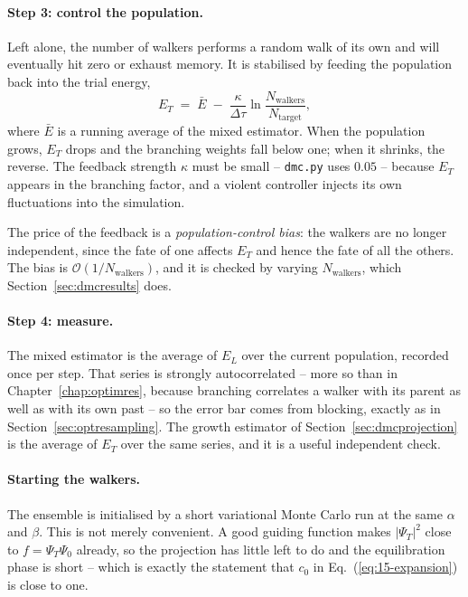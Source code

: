 \paragraph{Step 3: control the population.}
Left alone, the number of walkers performs a random walk of its own and will
eventually hit zero or exhaust memory.  It is stabilised by feeding the
population back into the trial energy,
\begin{equation}
  E_T \;=\; \bar{E} \;-\; \frac{\kappa}{\Delta\tau}
    \ln\frac{N_{\mathrm{walkers}}}{N_{\mathrm{target}}},
  \label{eq:15-populationcontrol}
\end{equation}
where $\bar{E}$ is a running average of the mixed estimator.  When the
population grows, $E_T$ drops and the branching weights fall below one; when
it shrinks, the reverse.  The feedback strength $\kappa$ must be small --
\texttt{dmc.py} uses $0.05$ -- because $E_T$ appears in the branching factor,
and a violent controller injects its own fluctuations into the simulation.

The price of the feedback is a \emph{population-control bias}: the walkers are
no longer independent, since the fate of one affects $E_T$ and hence the fate
of all the others.  The bias is $\mathcal{O}(1/N_{\mathrm{walkers}})$, and it
is checked by varying $N_{\mathrm{walkers}}$, which
Section~\ref{sec:dmcresults} does.

\paragraph{Step 4: measure.}
The mixed estimator is the average of $E_L$ over the current population,
recorded once per step.  That series is strongly autocorrelated -- more so
than in Chapter~\ref{chap:optimres}, because branching correlates a walker
with its parent as well as with its own past -- so the error bar comes from
blocking, exactly as in Section~\ref{sec:optresampling}.  The growth estimator
of Section~\ref{sec:dmcprojection} is the average of $E_T$ over the same
series, and it is a useful independent check.

\paragraph{Starting the walkers.}
The ensemble is initialised by a short variational Monte Carlo run at the same
$\alpha$ and $\beta$.  This is not merely convenient.  A good guiding function
makes $|\Psi_T|^2$ close to $f=\Psi_T\Psi_0$ already, so the projection has
little left to do and the equilibration phase is short -- which is exactly the
statement that $c_0$ in Eq.~(\ref{eq:15-expansion}) is close to one.

